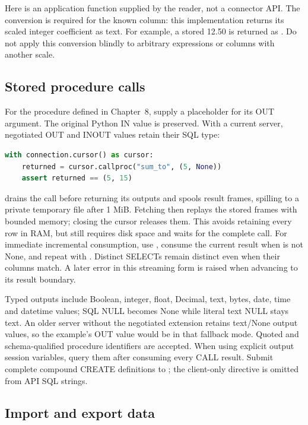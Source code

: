 Here  is an application function supplied by the reader, not a connector API. The  conversion is required for the known  column: this implementation returns its scaled integer coefficient as text. For example, a stored 12.50 is returned as . Do not apply this conversion blindly to arbitrary expressions or columns with another scale.

\subsection{Stored procedure calls}

For the  procedure defined in Chapter~8, supply a placeholder for
its OUT argument. The original Python IN value is preserved. With a current
server, negotiated OUT and INOUT values retain their SQL type:

\begin{lstlisting}[language=Python]
with connection.cursor() as cursor:
    returned = cursor.callproc("sum_to", (5, None))
    assert returned == (5, 15)
\end{lstlisting}

 drains the call before returning its outputs and spools result
frames, spilling to a private temporary file after 1 MiB. Fetching then replays
the stored frames with bounded memory; closing the cursor releases them.
This avoids retaining every row in RAM,
but still requires disk space and waits for the complete call. For immediate
incremental consumption, use , consume the current
result when  is not None, and repeat with .
Distinct SELECTs remain distinct even when their columns match. A later error
in this streaming form is raised when advancing to its result boundary.

Typed outputs include Boolean, integer, float, Decimal, text, bytes, date,
time and datetime values; SQL NULL becomes None while literal text NULL stays
text. An older server without the negotiated extension retains text/None output
values, so the example's OUT value would be  in that fallback mode.
Quoted and schema-qualified procedure identifiers are accepted.
When using explicit output session variables, query them after consuming every
CALL result. Submit complete compound CREATE definitions to ;
the client-only  directive is omitted from API SQL strings.

\subsection{Import and export data}

